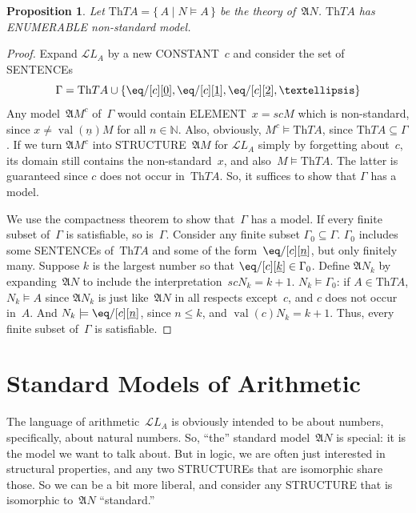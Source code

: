 \documentclass[10pt,a4paper]{article}
\newcommand*{\olup}[1]{\MakeUppercase{#1}}
\theoremstyle{plain}
\newtheorem{prop}[thm]{Proposition}
\theoremstyle{definition}
\theoremstyle{remark}
\newcommand*{\olfileid}[3]{}
\newcommand*{\olsection}[1]{\section*{#1}}
\providecommand{\Struct}{\ensuremath{\mathfrak{A}}}
\providecommand{\Assign}{\ensuremath{s}}
\providecommand{\Sat}[2]{\ensuremath{#1 \models #2}}
\providecommand{\Lang}{\ensuremath{\mathcal{L}}}
\providecommand{\Th}{\ensuremath{\mathrm{Th}}}
\providecommand{\num}[1]{\underline{#1}}
\providecommand{\Nat}{\ensuremath{\mathbb{N}}}
\providecommand{\Setabs}[2]{\{\, #1 \mid #2 \,\}}
\providecommand{\Value}[1]{\operatorname{val}(#1)}
\begin{document}
\begin{prop}
Let $\Th{TA} = \Setabs{A}{\Sat{N}{A}}$ be the theory
of~$\Struct{N}$. $\Th{TA}$ has \olup{enumerable} non-standard model.
\end{prop}

\begin{proof}
Expand $\Lang{L_A}$ by a new \olup{constant}~$c$ and consider the set of
\olup{sentence}s
\[
\Gamma = \Th{TA} \cup \{\eq/[c][\num{0}], \eq/[c][\num{1}],
\eq/[c][\num{2}], \dots\}
\]
Any model~$\Struct{M^c}$ of~$\Gamma$ would contain \olup{element}~$x =
\Assign{c}{M}$ which is non-standard, since $x \neq
\Value{\num{n}}{M}$ for all $n \in \Nat$. Also, obviously,
$\Sat{M^c}{\Th{TA}}$, since $\Th{TA} \subseteq \Gamma$. If we turn
$\Struct{M^c}$ into \olup{structure}~$\Struct{M}$ for $\Lang{L_A}$
simply by forgetting about~$c$, its domain still contains the
non-standard~$x$, and also~$\Sat{M}{\Th{TA}}$. The latter is
guaranteed since $c$ does not occur in~$\Th{TA}$. So, it suffices to
show that $\Gamma$ has a model.

We use the compactness theorem to show that~$\Gamma$ has a model. If
every finite subset of~$\Gamma$ is satisfiable, so
is~$\Gamma$. Consider any finite subset $\Gamma_0 \subseteq
\Gamma$. $\Gamma_0$ includes some \olup{sentence}s of~$\Th{TA}$ and some
of the form~$\eq/[c][\num{n}]$, but only finitely many. Suppose $k$ is
the largest number so that $\eq/[c][\num{k}] \in \Gamma_0$. Define
$\Struct{N_k}$ by expanding~$\Struct{N}$ to include the
interpretation~$\Assign{c}{N_k} = k+1$. $\Sat{N_k}{\Gamma_0}$: if $A
\in \Th{TA}$, $\Sat{N_k}{A}$ since $\Struct{N_k}$ is just
like~$\Struct{N}$ in all respects except~$c$, and $c$ does not occur
in~$A$. And $\Sat{N_k}{\eq/[c][\num{n}]}$, since $n \le k$, and
$\Value{c}{N_k} = k+1$. Thus, every finite subset of~$\Gamma$ is
satisfiable.
\end{proof}





\olfileid{mod}{mar}{stm}
\olsection{Standard Models of Arithmetic}

The language of arithmetic~$\Lang{L_A}$ is obviously intended to be
about numbers, specifically, about natural numbers. So, ``the''
standard model~$\Struct{N}$ is special: it is the model we want to
talk about. But in logic, we are often just interested in structural
properties, and any two \olup{structure}s that are isomorphic share
those.  So we can be a bit more liberal, and consider any
\olup{structure} that is isomorphic to~$\Struct{N}$ ``standard.''
\end{document}
